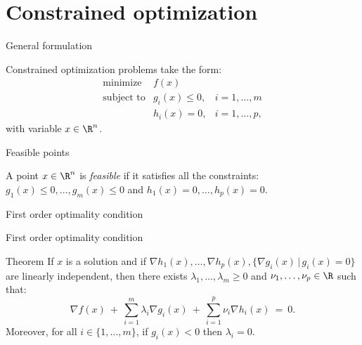 \documentclass{beamer}
\begin{document}
\section{Constrained optimization}

\begin{frame}[t]{General formulation}
	\grid

	Constrained optimization problems take the form:
	\begin{equation}\label{eq:problem}
		\begin{array}{lll}
			\text{minimize} & f(x) & \\
			\text{subject to} & g_i(x) \leq 0, & i=1, \dots, m \\
							  & h_i(x) = 0, & i=1, \dots, p,
		\end{array}
	\end{equation}
	with variable $x \in \R^n$.
\end{frame}

\begin{frame}[t]{Feasible points}
	\grid
	\begin{definition}
		A point $x \in \R^n$ is \emph{feasible} if it satisfies all the constraints: $g_1(x) \leq 0, \dots, g_m(x)\leq  0$ and $h_1(x) = 0, \dots, h_p(x) = 0$. 
	\end{definition}


\end{frame}

\begin{frame}[t]{First order optimality condition}
	\grid

	\pause
	\pause
\end{frame}

\begin{frame}[t]{First order optimality condition}
	\grid

	\vspace{-0.4cm}
	\begin{block}{Theorem}
		If $x$ is a solution and if $\nabla h_1(x), \dots, \nabla h_p(x), \{\nabla g_i(x) \, | \, g_i(x) = 0 \}$ are linearly independent,
		then there exists $\lambda_1, \dots, \lambda_m \geq 0$ and $\nu_1, \dots, \nu_p \in \R$ such that:
		\begin{equation}\label{eq:kkt1}
			\nabla f(x) \ + \ \sum_{i=1}^m \lambda_i \nabla g_i(x) \ + \ \sum_{i=1}^p \nu_i \nabla h_i(x)  \ = \ 0.
		\end{equation}
		Moreover, for all  $i\in \{1, \dots, m\}$, if $g_i(x) < 0$ then $\lambda_i = 0$.
	\end{block}

\end{frame}
\end{document}
